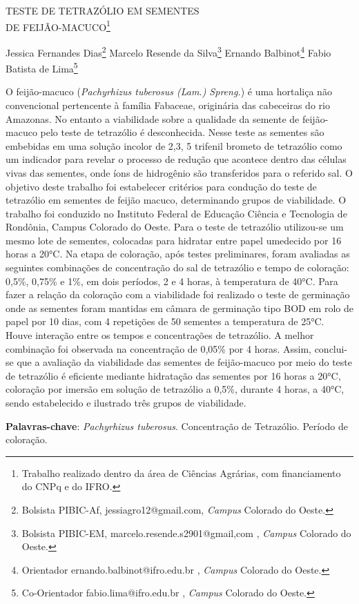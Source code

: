 \documentclass[article,12pt,onesidea,4paper,english,brazil]{abntex2}
\begin{document}
	
	
	\frenchspacing 
	
	\begin{center}
		\LARGE TESTE DE TETRAZÓLIO EM SEMENTES\\DE FEIJÃO-MACUCO\footnote{Trabalho realizado dentro da área de Ciências Agrárias, com financiamento do CNPq e do IFRO.}
		
		\normalsize
		Jessica Fernandes Dias\footnote{Bolsista PIBIC-Af, jessiagro12@gmail.com, \textit{Campus} Colorado do Oeste.} 
		Marcelo Resende da Silva\footnote{Bolsista PIBIC-EM, marcelo.resende.s2901@gmail,com , \textit{Campus} Colorado do Oeste.} 
		Ernando Balbinot\footnote{Orientador ernando.balbinot@ifro.edu.br , \textit{Campus} Colorado do Oeste.} 
		Fabio Batista de Lima\footnote{Co-Orientador fabio.lima@ifro.edu.br , \textit{Campus} Colorado do Oeste.} 
	\end{center}
	
	\noindent O feijão-macuco (\textit{Pachyrhizus tuberosus (Lam.) Spreng.}) é uma hortaliça não
	convencional pertencente à família Fabaceae, originária das cabeceiras do rio
	Amazonas. No entanto a viabilidade sobre a qualidade da semente de feijão-macuco
	pelo teste de tetrazólio é desconhecida. Nesse teste as sementes são embebidas
	em uma solução incolor de 2,3, 5 trifenil brometo de tetrazólio como um indicador
	para revelar o processo de redução que acontece dentro das células vivas das
	sementes, onde íons de hidrogênio são transferidos para o referido sal. O objetivo
	deste trabalho foi estabelecer critérios para condução do teste de tetrazólio em
	sementes de feijão macuco, determinando grupos de viabilidade. O trabalho foi
	conduzido no Instituto Federal de Educação Ciência e Tecnologia de Rondônia,
	Campus Colorado do Oeste. Para o teste de tetrazólio utilizou-se um mesmo lote de
	sementes, colocadas para hidratar entre papel umedecido por 16 horas a 20°C. Na
	etapa de coloração, após testes preliminares, foram avaliadas as seguintes
	combinações de concentração do sal de tetrazólio e tempo de coloração: 0,5\%,
	0,75\% e 1\%, em dois períodos, 2 e 4 horas, à temperatura de 40°C. Para fazer a
	relação da coloração com a viabilidade foi realizado o teste de germinação onde as
	sementes foram mantidas em câmara de germinação tipo BOD em rolo de papel por
	10 dias, com 4 repetições de 50 sementes a temperatura de 25°C. Houve interação
	entre os tempos e concentrações de tetrazólio. A melhor combinação foi observada
	na concentração de 0,05\% por 4 horas. Assim, conclui-se que a avaliação da
	viabilidade das sementes de feijão-macuco por meio do teste de tetrazólio é eficiente
	mediante hidratação das sementes por 16 horas a 20°C, coloração por imersão em
	solução de tetrazólio a 0,5\%, durante 4 horas, a 40°C, sendo estabelecido e
	ilustrado três grupos de viabilidade.
	
	\vspace{\onelineskip}
	
	\noindent
	\textbf{Palavras-chave}: \textit{Pachyrhizus tuberosus}. Concentração de Tetrazólio. Período de coloração.	
	
\end{document}
